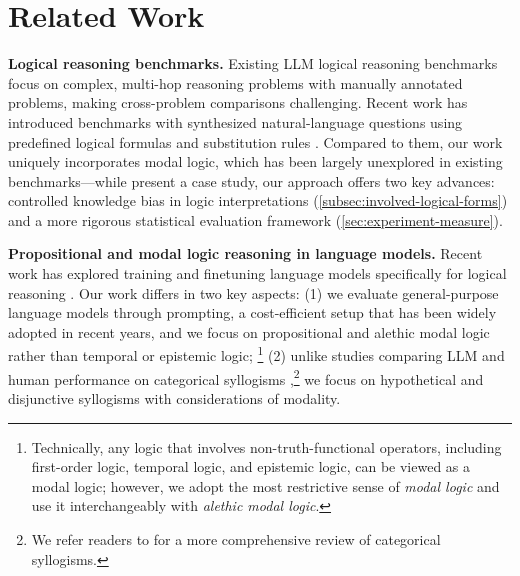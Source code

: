 \section{Related Work}
\label{sec:related}
\noindent \textbf{Logical reasoning benchmarks.}
Existing LLM logical reasoning benchmarks  focus on complex, multi-hop reasoning problems with manually annotated problems, making cross-problem comparisons challenging.
Recent work has introduced benchmarks with synthesized natural-language questions using predefined logical formulas and substitution rules .
Compared to them, our work uniquely incorporates modal logic, which has been largely unexplored in existing benchmarks---while \citet{hollidayConditionalModalReasoning2024} present a case study, our approach offers two key advances: controlled knowledge bias in logic interpretations (\cref{subsec:involved-logical-forms}) and a more rigorous statistical evaluation framework (\cref{sec:experiment-measure}).

\vspace{2pt}
\noindent \textbf{Propositional and modal logic reasoning in language models.}
Recent work has explored training and finetuning language models specifically for logical reasoning \citep{clark-etal-2021-transformers,hahn-etal-2021-teaching,tafjord-etal-2022-entailer}.
Our work differs in two key aspects: (1) we evaluate general-purpose language models through prompting, a cost-efficient setup that has been widely adopted in recent years, and we focus on propositional and alethic modal logic rather than temporal \citep{hahn-etal-2021-teaching} or epistemic \citep{sileo-lernould-2023-mindgames} logic; \footnote{Technically, any logic that involves non-truth-functional operators, including first-order logic, temporal logic, and epistemic logic, can be viewed as a modal logic; however, we adopt the most restrictive sense of \textit{modal logic} \citep{sep-logic-modal-origins} and use it interchangeably with \textit{alethic modal logic}.}
(2) unlike studies comparing LLM and human performance on categorical syllogisms ,\footnote{
    We refer readers to \citet{zong-lin-2024-categorical} for a more comprehensive review of categorical syllogisms.} we focus on hypothetical and disjunctive syllogisms with considerations of modality.


